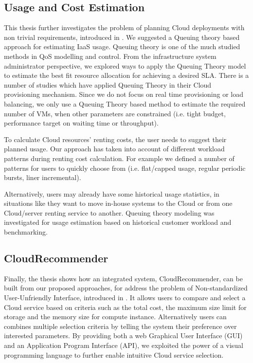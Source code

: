 \subsection{Usage and Cost Estimation}
This thesis further investigates the problem of planning Cloud deployments with non trivial requirements, introduced in .
We suggested a Queuing theory based approach for estimating IaaS usage.
Queuing theory is one of the much studied methods in QoS modelling and control.
From the infrastructure system administrator perspective, we explored ways to apply the Queuing Theory model to estimate the best fit resource allocation for achieving a desired SLA. 
There is a number of studies \cite{lee:10,RodrigoICPP,xuzichuan} which have applied Queuing Theory in their Cloud provisioning mechanism. Since we do not focus on real time provisioning or load balancing, we only use a Queuing Theory based method to estimate the required number of VMs, when other parameters are constrained (i.e. tight budget, performance target on waiting time or throughput).

To calculate Cloud resources' renting costs, the user needs to suggest their planned usage. Our approach has taken into account of different workload patterns during renting cost calculation. For example we defined a number of patterns for users to quickly choose from (i.e. flat/capped usage, regular periodic bursts, liner incremental). 

Alternatively, users may already have some historical
usage statistics, in situations like they want to move in-house systems to the Cloud or from one Cloud/server renting service to another. 
Queuing theory modeling was investigated for usage estimation based on historical customer workload and benchmarking.

\subsection{CloudRecommender}
Finally, the thesis shows how an integrated system, CloudRecommender, can be built from our proposed approaches, for address the problem of Non-standardized User-Unfriendly Interface, introduced in .
It allows users to compare and select a Cloud service based on criteria such as the total cost, the maximum size limit for storage and the memory size for compute instance. 
Alternatively users can combines multiple selection criteria by telling the system their preference over interested parameters.
By providing both a web Graphical User Interface (GUI) and an Application Program Interface (API), we exploited the power of a visual programming
language to further enable intuitive Cloud service selection.

